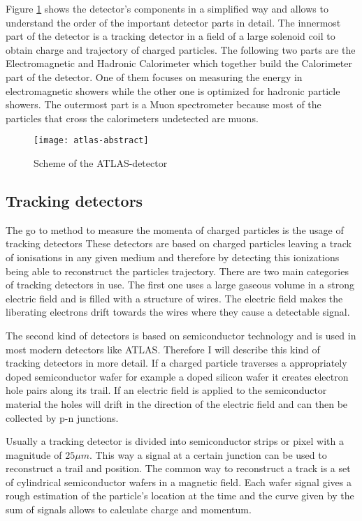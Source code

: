 Figure \ref{fig:atlas_sketch} shows the detector's components in a simplified way and allows to understand the order of the important detector parts in detail. The innermost part of the detector is a tracking detector in a field of a large solenoid coil to obtain charge and trajectory of charged particles.
The following two parts are the Electromagnetic and Hadronic Calorimeter which together build the Calorimeter part of the detector. One of them focuses on measuring the energy in electromagnetic showers while the other one is optimized for hadronic particle showers. The outermost part is a Muon spectrometer because most of the particles that cross the calorimeters undetected are muons.


\begin{figure}[h]
  \centering
  \texttt{[image: atlas-abstract]}
  \caption[Sketch of the transversal section of the ATLAS detector]{Scheme of the ATLAS-detector \cite{atlasfigures}}
  \label{fig:atlas_sketch}
\end{figure}

\subsection{Tracking detectors}

The go to method to measure the momenta of charged particles is the usage of tracking detectors
These detectors are based on charged particles leaving a track of ionisations in any given medium and therefore by detecting this ionizations being able to reconstruct the particles trajectory.
There are two main categories of tracking detectors in use. The first one uses a large gaseous volume in a strong electric field and is filled with a structure of wires. The electric field makes the liberating electrons drift towards the wires where they cause a detectable signal.

The second kind of detectors is based on semiconductor technology and is used in most modern detectors like ATLAS. Therefore I will describe this kind of tracking detectors in more detail.
If a charged particle traverses a appropriately doped semiconductor wafer for example a doped silicon wafer it creates electron hole pairs along its trail. If an electric field is applied to the semiconductor material the holes will drift in the direction of the electric field and can then be collected by p-n junctions.

Usually a tracking detector is divided into semiconductor strips or pixel with a magnitude of $25 \mu m$. This way a signal at a certain junction can be used to reconstruct a trail and position. The common way to reconstruct a track is a set of cylindrical semiconductor wafers in a magnetic field. Each wafer signal gives a rough estimation of the particle's location at the time and the curve given by the sum of signals allows to calculate charge and momentum.

